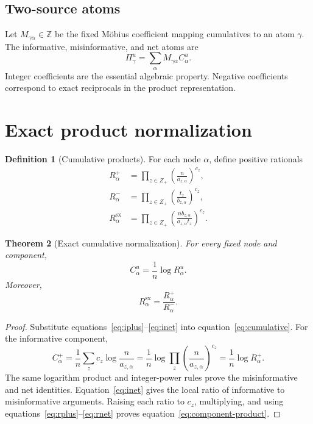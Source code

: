 \documentclass[11pt]{article}
\newtheorem{theorem}{Theorem}[section]
\theoremstyle{definition}
\newtheorem{definition}[theorem]{Definition}
\newcommand{\sx}{\mathrm{sx}}
\begin{document}
\subsection{Two-source atoms}

Let \(M_{\gamma\alpha}\in\mathbb Z\) be the fixed M\"obius coefficient mapping cumulatives to an
atom \(\gamma\).  The informative, misinformative, and net atoms are
\begin{equation}\label{eq:atom}
\Pi^u_\gamma=\sum_\alpha M_{\gamma\alpha}C^u_\alpha.
\end{equation}
Integer coefficients are the essential algebraic property.  Negative coefficients correspond to
exact reciprocals in the product representation.

\section{Exact product normalization}

\begin{definition}[Cumulative products]
For each node \(\alpha\), define positive rationals
\begin{align}
R^+_\alpha
 &=\prod_{z\in Z_+}\left(\frac{n}{a_{z,\alpha}}\right)^{c_z},\label{eq:rplus}\\
R^-_\alpha
 &=\prod_{z\in Z_+}\left(\frac{t_z}{b_{z,\alpha}}\right)^{c_z},\label{eq:rminus}\\
R^{\sx}_\alpha
 &=\prod_{z\in Z_+}
   \left(\frac{n b_{z,\alpha}}{a_{z,\alpha}t_z}\right)^{c_z}.\label{eq:rnet}
\end{align}
\end{definition}

\begin{theorem}[Exact cumulative normalization]\label{thm:cumulative}
For every fixed node and component,
\begin{equation}\label{eq:cum-normalized}
C^u_\alpha=\frac1n\log R^u_\alpha.
\end{equation}
Moreover,
\begin{equation}\label{eq:component-product}
R^{\sx}_\alpha=\frac{R^+_\alpha}{R^-_\alpha}.
\end{equation}
\end{theorem}

\begin{proof}
Substitute equations~\eqref{eq:iplus}--\eqref{eq:inet} into
equation~\eqref{eq:cumulative}.  For the informative component,
\[
C^+_\alpha
=\frac1n\sum_z c_z\log\frac{n}{a_{z,\alpha}}
=\frac1n\log\prod_z\left(\frac{n}{a_{z,\alpha}}\right)^{c_z}
=\frac1n\log R^+_\alpha.
\]
The same logarithm product and integer-power rules prove the misinformative and net identities.
Equation~\eqref{eq:inet} gives the local ratio of informative to misinformative arguments.  Raising
each ratio to \(c_z\), multiplying, and using equations~\eqref{eq:rplus}--\eqref{eq:rnet} proves
equation~\eqref{eq:component-product}.
\end{proof}
\end{document}
